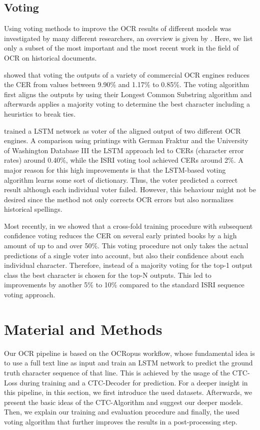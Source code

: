 \documentclass{jlcl}
\begin{document}
\subsection{Voting}

Using voting methods to improve the OCR results of different models was investigated by many different researchers, an overview is given by \cite{handley1998improving}.
Here, we list only a subset of the most important and the most recent work in the field of OCR on historical documents.

\cite{rice1996fifth} showed that voting the outputs of a variety of commercial OCR engines reduces the CER from values between 9.90\% and 1.17\% to 0.85\%.
The voting algorithm first aligns the outputs by using their Longest Common Substring algorithm \citep{rice1994algorithm} and afterwards applies a majority voting to determine the best character including a heuristics to break ties.

\cite{al2015combination} trained a LSTM network as voter of the aligned output of two different OCR engines.
A comparison using printings with German Fraktur and the University of Washington Database III the LSTM approach led to CERs (character error rates) around 0.40\%, while the ISRI voting tool achieved CERs around 2\%.
A major reason for this high improvements is that the LSTM-based voting algorithm learns some sort of dictionary.
Thus, the voter predicted a correct result although each individual voter failed.
However, this behaviour might not be desired since the method not only corrects OCR errors but also normalizes historical spellings.

Most recently, in \cite{reul2017voting} we showed that a cross-fold training procedure with subsequent confidence voting reduces the CER on several early printed books by a high amount of up to and over 50\%.
This voting procedure not only takes the actual predictions of a single voter into account, but also their confidence about each individual character.
Therefore, instead of a majority voting for the top-1 output class the best character is chosen for the top-N outputs.
This led to improvements by another 5\% to 10\% compared to the standard ISRI sequence voting approach.

\section{Material and Methods}
Our OCR pipeline is based on the OCRopus workflow, whose fundamental idea is to use a full text line as input and train an LSTM network to predict the ground truth character sequence of that line.
This is achieved by the usage of the CTC-Loss during training and a CTC-Decoder for prediction.
For a deeper insight in this pipeline, in this section, we first introduce the used datasets.
Afterwards, we present the basic ideas of the CTC-Algorithm and suggest our deeper models.
Then, we explain our training and evaluation procedure and finally, the used voting algorithm that further improves the results in a post-processing step.
\end{document}
